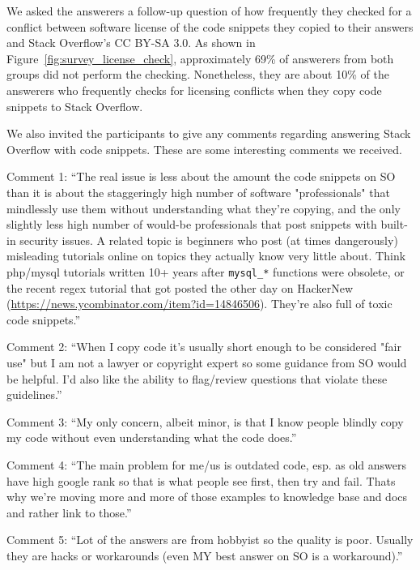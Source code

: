 \documentclass{svjour3}                     %
\begin{document}
We asked the answerers a follow-up question of how frequently they checked for a conflict between software license of the code snippets they copied to their answers and Stack Overflow's CC BY-SA 3.0. As shown in Figure~\ref{fig:survey_license_check}, approximately 69\% of answerers from both groups did not perform the checking. Nonetheless, they are about 10\% of the answerers who frequently checks for licensing conflicts when they copy code snippets to Stack Overflow.

\vspace{0.5cm}
\noindent{}
\vspace{0.5cm}

We also invited the participants to give any comments regarding answering Stack Overflow with code snippets. These are some interesting comments we received.

Comment 1: ``The real issue is less about the amount the code snippets on SO than it is about the staggeringly high number of software "professionals" that mindlessly use them without understanding what they're copying, and the only slightly less high number of would-be professionals that post snippets with built-in security issues.  A related topic is beginners who post (at times dangerously) misleading tutorials online on topics they actually know very little about. Think php/mysql tutorials written 10+ years after \texttt{mysql\_*} functions were obsolete, or the recent regex tutorial that got posted the other day on HackerNew (\url{https://news.ycombinator.com/item?id=14846506}). They're also full of toxic code snippets.''

Comment 2: ``When I copy code it's usually short enough to be considered "fair use" but I am not a lawyer or copyright expert so some guidance from SO would be helpful. I'd also like the ability to flag/review questions that violate these guidelines.''

Comment 3: ``My only concern, albeit minor, is that I know people blindly copy my code without even understanding what the code does.''

Comment 4: ``The main problem for me/us is outdated code, esp. as old answers have high google rank so that is what people see first, then try and fail. Thats why we're moving more and more of those examples to knowledge base and docs and rather link to those.''

Comment 5: ``Lot of the answers are from hobbyist so the quality is poor. Usually they are hacks or workarounds (even MY best answer on SO is a workaround).''
\end{document}
